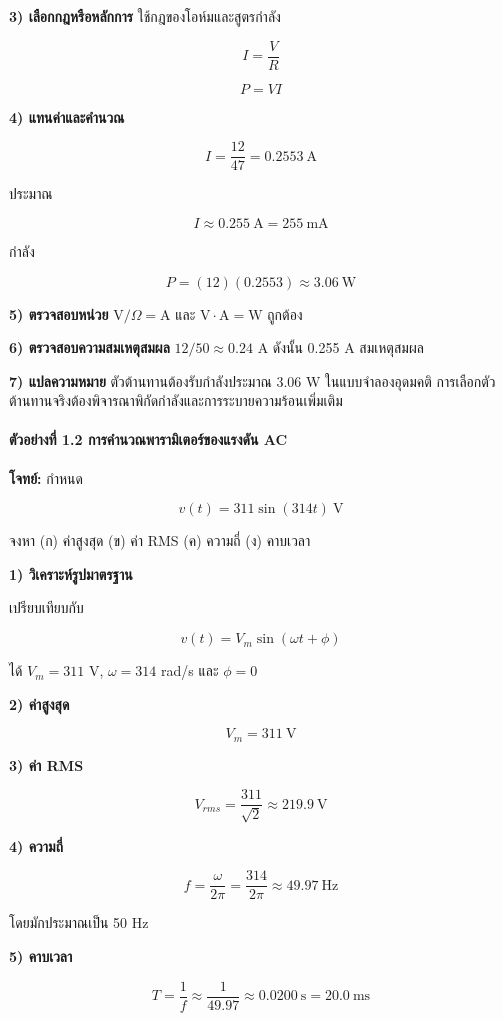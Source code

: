 \textbf{3) เลือกกฎหรือหลักการ}
ใช้กฎของโอห์มและสูตรกำลัง

\[
I=\frac{V}{R}
\]

\[
P=VI
\]

\textbf{4) แทนค่าและคำนวณ}

\[
I=\frac{12}{47}=0.2553\ \mathrm{A}
\]

ประมาณ

\[
I\approx0.255\ \mathrm{A}=255\ \mathrm{mA}
\]

กำลัง

\[
P=(12)(0.2553)\approx3.06\ \mathrm{W}
\]

\textbf{5) ตรวจสอบหน่วย}
$\mathrm{V}/\Omega=\mathrm{A}$ และ $\mathrm{V}\cdot\mathrm{A}=\mathrm{W}$ ถูกต้อง

\textbf{6) ตรวจสอบความสมเหตุสมผล}
$12/50\approx0.24$ A ดังนั้น 0.255 A สมเหตุสมผล

\textbf{7) แปลความหมาย}
ตัวต้านทานต้องรับกำลังประมาณ 3.06 W ในแบบจำลองอุดมคติ การเลือกตัวต้านทานจริงต้องพิจารณาพิกัดกำลังและการระบายความร้อนเพิ่มเติม

 

\paragraph{ตัวอย่างที่ 1.2 การคำนวณพารามิเตอร์ของแรงดัน AC}

\textbf{โจทย์:} กำหนด

\[
v(t)=311\sin(314t)\ \mathrm{V}
\]

จงหา (ก) ค่าสูงสุด (ข) ค่า RMS (ค) ความถี่ (ง) คาบเวลา

\textbf{1) วิเคราะห์รูปมาตรฐาน}

เปรียบเทียบกับ

\[
v(t)=V_m\sin(\omega t+\phi)
\]

ได้ $V_m=311$ V, $\omega=314$ rad/s และ $\phi=0$

\textbf{2) ค่าสูงสุด}

\[
V_m=311\ \mathrm{V}
\]

\textbf{3) ค่า RMS}

\[
V_{rms}=\frac{311}{\sqrt{2}}\approx219.9\ \mathrm{V}
\]

\textbf{4) ความถี่}

\[
f=\frac{\omega}{2\pi}=\frac{314}{2\pi}\approx49.97\ \mathrm{Hz}
\]

โดยมักประมาณเป็น 50 Hz

\textbf{5) คาบเวลา}

\[
T=\frac{1}{f}\approx\frac{1}{49.97}\approx0.0200\ \mathrm{s}=20.0\ \mathrm{ms}
\]

